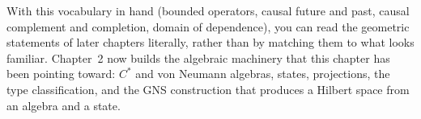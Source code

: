 With this vocabulary in hand (bounded operators, causal future and past, causal complement and completion,
domain of dependence), you can read the geometric statements of later chapters literally, rather than by
matching them to what looks familiar. Chapter~2 now builds the algebraic machinery that this chapter has been
pointing toward: $C^*$ and von Neumann algebras, states, projections, the type classification, and the GNS
construction that produces a Hilbert space from an algebra and a state.

